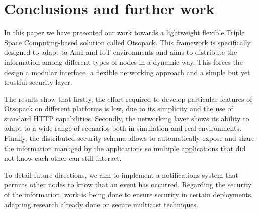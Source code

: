 

\section{Conclusions and further work}

In this paper we have presented our work towards a lightweight flexible Triple Space Computing-based solution called
Otsopack. This framework is specifically designed to adapt to AmI and IoT environments and aims to distribute the
information among different types of nodes in a dynamic way. This forces the design a modular interface, a flexible
networking approach and a simple but yet trustful security layer.

The results show that firstly, the effort required to develop particular features of Otsopack on different platforms is
low, due to its simplicity and the use of standard HTTP capabilities. Secondly, the networking layer shows its ability
to adapt to a wide range of scenarios both in simulation and real environments. Finally, the distributed security schema
allows to automatically expose and share the information managed by the applications so multiple applications that did
not know each other can still interact.

To detail future directions, we aim to implement a notifications system that permits other nodes to know that an event
has occurred. Regarding the security of the information, work is being done to ensure security in certain deployments,
adapting research already done on secure multicast \cite{naranjo2011suite} techniques.
